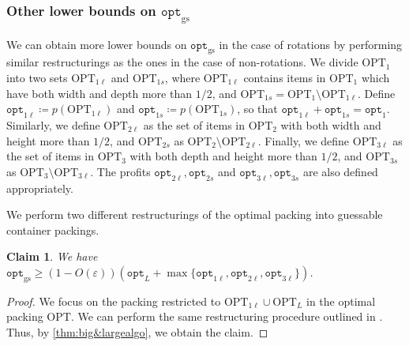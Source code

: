 \documentclass[10pt,a4paper]{amsart}
\newcommand{\kvnr}[1]{}
\newcommand{\eps}{\varepsilon}
\newtheorem{claim}[theorem]{Claim}
\theoremstyle{definition}
\newcommand{\opt}{\mathtt{opt}}
\newcommand{\optgs}{\mathtt{opt}_{\mathrm{gs}}}
\newcommand{\OPT}{\mathrm{OPT}}
\begin{document}
\subsubsection{Other lower bounds on \texorpdfstring{$\optgs$}{optgs}}
\label{sec:appxratio}
We can obtain more lower bounds on $\optgs$ in the case of rotations by performing similar restructurings as the ones in the case of non-rotations.
We divide $\OPT_1$ into two sets $\OPT_{1\ell}$ and $\OPT_{1s}$, where $\OPT_{1\ell}$ contains items in $\OPT_1$ which have both width and depth more than $1/2$, and $\OPT_{1s}=\OPT_1\setminus \OPT_{1\ell}$.
Define $\opt_{1\ell}\coloneqq p(\OPT_{1\ell})$ and $\opt_{1s}\coloneqq p(\OPT_{1s})$, so that $\opt_{1\ell} + \opt_{1s} = \opt_1$. Similarly, we define $\OPT_{2\ell}$ as the set of items in $\OPT_2$ with both width and height more than $1/2$, and $\OPT_{2s}$ as $\OPT_2\setminus \OPT_{2\ell}$.
Finally, we define $\OPT_{3\ell}$ as the set of items in $\OPT_3$ with both depth and height more than $1/2$, and $\OPT_{3s}$ as $\OPT_3\setminus \OPT_{3\ell}$.
The profits $\opt_{2\ell}, \opt_{2s}$ and $\opt_{3\ell}, \opt_{3s}$ are also defined appropriately.

We perform two different restructurings of the optimal packing into guessable container packings. 

\begin{claim}
    \label{claim:rot-number-theory}
    We have $\optgs\ge (1-O(\eps))(\opt_L+\max\{\opt_{1\ell},\opt_{2\ell},\opt_{3\ell}\})$.
\end{claim}
\begin{proof}
    We focus on the packing restricted to $\OPT_{1\ell}\cup\OPT_L$ in the optimal packing $\OPT$.
    We can perform the same restructuring procedure outlined in . Thus, by \cref{thm:big&largealgo}, we obtain the claim.
\end{proof}
\end{document}
